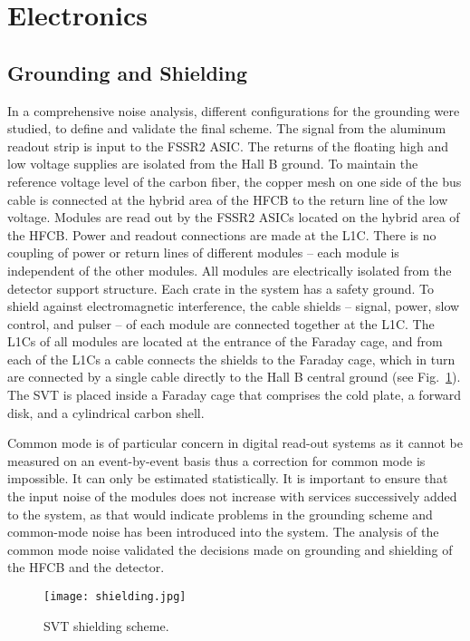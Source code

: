 \section{Electronics}

\subsection{Grounding and Shielding}

In a comprehensive noise analysis, different configurations for the grounding were studied, to define and validate the final scheme. The signal from the aluminum readout strip is input to the FSSR2 ASIC. The returns of the floating high and low voltage supplies are isolated from the Hall B ground. To maintain the reference voltage level of the carbon fiber, the copper mesh on one side of the bus cable is connected at the hybrid area of the HFCB to the return line of the low voltage. Modules are read out by the FSSR2 ASICs located on the hybrid area of the HFCB. Power and readout connections are made at the L1C. There is no coupling of power or return lines of different modules -- each module is independent of the other modules. All modules are electrically isolated from the detector support structure. 
Each crate in the system has a safety ground. To shield against electromagnetic interference, the cable shields -- signal, power, slow control, and pulser -- of each module are connected together at the L1C. The L1Cs of all modules are located at the entrance of the Faraday cage, and from each of the L1Cs a cable connects the shields to the Faraday cage, which in turn are connected by a single cable directly to the Hall B central ground (see Fig.~\ref{fig:shielding}). The SVT is placed inside a Faraday cage that comprises the cold plate, a forward disk, and a cylindrical carbon shell. 

Common mode is of particular concern in digital read-out systems as it cannot be measured on an event-by-event basis thus a correction for common mode is impossible. It can only be estimated statistically. It is important to ensure that the input noise of the modules does not increase with services successively added to the system, as that would indicate problems in the grounding scheme and common-mode noise has been introduced into the system. The analysis of the common mode noise validated the decisions made on grounding and shielding of the HFCB and the detector.

\begin{figure}[hbt] 
\centering 
\texttt{[image: shielding.jpg]}
\caption{SVT shielding scheme.}
\label{fig:shielding}
\end{figure}


